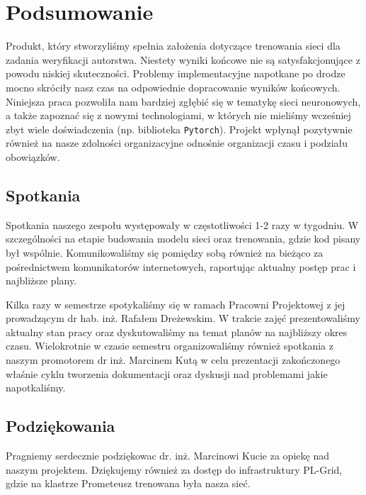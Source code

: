 \section{Podsumowanie}

Produkt, który stworzyliśmy spełnia założenia dotyczące trenowania sieci dla zadania weryfikacji autorstwa.
Niestety wyniki końcowe nie są satysfakcjonujące z powodu niskiej skuteczności. Problemy implementacyjne 
napotkane po drodze mocno skróciły nasz czas na odpowiednie dopracowanie wyników końcowych.
\newline
\newline
Niniejsza praca pozwoliła nam bardziej zgłębić się w tematykę sieci neuronowych, 
a także zapoznać się z nowymi technologiami, w których nie mieliśmy wcześniej zbyt wiele doświadczenia
(np. biblioteka \texttt{Pytorch}). Projekt wpłynął pozytywnie również na nasze zdolności organizacyjne
odnośnie organizacji czasu i podziału obowiązków.

\subsection{Spotkania}
Spotkania naszego zespołu występowały w częstotliwości 1-2 razy w tygodniu. W szczególności na etapie
budowania modelu sieci oraz trenowania, gdzie kod pisany był wspólnie.
Komunikowaliśmy się pomiędzy sobą również na bieżąco za pośrednictwem komunikatorów internetowych, 
raportując aktualny postęp prac i najbliższe plany.

Kilka razy w semestrze spotykaliśmy się w ramach Pracowni Projektowej z jej prowadzącym dr hab. inż. Rafałem Dreżewskim.
W trakcie zajęć prezentowaliśmy aktualny stan pracy oraz dyskutowaliśmy na temat planów na najbliższy okres czasu.
\newline
\newline
Wielokrotnie w czasie semestru organizowaliśmy również spotkania z naszym promotorem dr inż. Marcinem Kutą 
w celu prezentacji zakończonego właśnie cyklu tworzenia dokumentacji oraz dyskusji nad problemami jakie napotkaliśmy.

\subsection{Podziękowania}
Pragniemy serdecznie podziękowac dr. inż. Marcinowi Kucie za opiekę nad naszym projektem.
Dziękujemy również za dostęp do infrastruktury PL-Grid, gdzie na klastrze Prometeusz trenowana była
nasza sieć.
